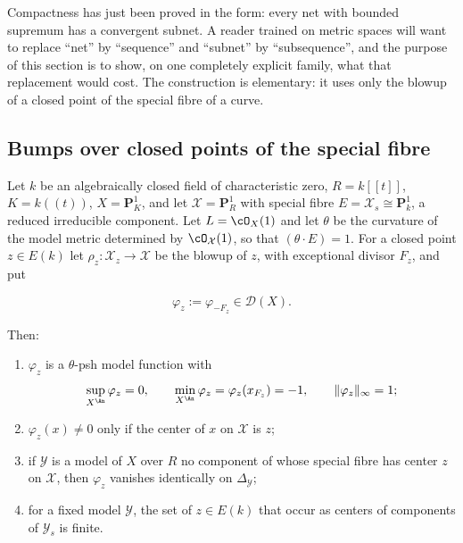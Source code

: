 Compactness has just been proved in the form: every net with bounded
supremum has a convergent subnet.  A reader trained on metric spaces will
want to replace ``net'' by ``sequence'' and ``subnet'' by ``subsequence'',
and the purpose of this section is to show, on one completely explicit
family, what that replacement would cost.  The construction is elementary:
it uses only the blowup of a closed point of the special fibre of a curve.

\subsection{Bumps over closed points of the special fibre}

\begin{lemma}
\label{lem:ch22-bump}
Let $k$ be an algebraically closed field of characteristic zero,
$R=k[[t]]$, $K=k((t))$, $X=\mathbf P^1_K$, and let
$\mathcal X=\mathbf P^1_R$ with special fibre $E=\mathcal X_s\cong
\mathbf P^1_k$, a reduced irreducible component.  Let $L=\cO_X(1)$ and let
$\theta$ be the curvature of the model metric determined by
$\cO_{\mathcal X}(1)$, so that $(\theta\cdot E)=1$.  For a closed point
$z\in E(k)$ let $\rho_z:\mathcal X_z\to\mathcal X$ be the blowup of
$z$, with exceptional divisor $F_z$, and put

\[
 \varphi_z:=\varphi_{-F_z}\in\mathcal D(X).
\tag{22.69}\label{eq:ch22-bump-function}
\]

Then:
\begin{enumerate}
\item\label{itm:ch22-bump:psh} $\varphi_z$ is a $\theta$-psh model
function with
\[
 \sup_{X^{\An}}\varphi_z=0,
 \qquad
 \min_{X^{\An}}\varphi_z=\varphi_z(x_{F_z})=-1,
 \qquad
 \|\varphi_z\|_\infty=1 ;
\]
\item\label{itm:ch22-bump:support} $\varphi_z(x)\neq0$ only if the center
of $x$ on $\mathcal X$ is $z$;
\item\label{itm:ch22-bump:invisible} if $\mathcal Y$ is a model of $X$
over $R$ no component of whose special fibre has center $z$ on
$\mathcal X$, then $\varphi_z$ vanishes identically on
$\Delta_{\mathcal Y}$;
\item\label{itm:ch22-bump:centers} for a fixed model $\mathcal Y$, the set
of $z\in E(k)$ that occur as centers of components of
$\mathcal Y_s$ is finite.
\end{enumerate}
\end{lemma}

